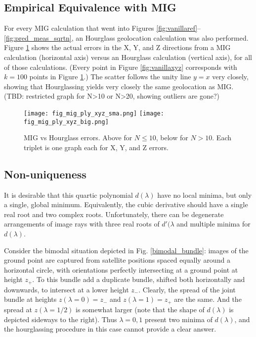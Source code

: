 \documentclass{amsart}
\begin{document}
\subsection{Empirical Equivalence with MIG}
For every MIG calculation that went into Figures
\ref{fig:vanillaref}--\ref{fig:pred_meas_sqrtn}, an Hourglass geolocation
calculation was also performed. Figure \ref{fig:mig_vs_hourglass} shows the
actual errors in the X, Y, and Z directions from a MIG calculation (horizontal
axis) versus an Hourglass calculation (vertical axis), for all of those
calculations. (Every point in Figure \ref{fig:vanillaxyz} corresponds with
$k=100$ points in Figure \ref{fig:mig_vs_hourglass}.) The scatter follows the
unity line $y=x$ very closely, showing that Hourglassing yields very closely the
same geolocation as MIG. (TBD: restricted graph for N>10 or N>20, showing
outliers are gone?)

\begin{figure}
\texttt{[image: fig\_mig\_ply\_xyz\_sma.png]}
\texttt{[image: fig\_mig\_ply\_xyz\_big.png]}
\caption{\label{fig:mig_vs_hourglass}MIG vs Hourglass errors.  Above for $N\le
  10$, below for $N>10$. Each triplet is one graph each for X, Y, and Z errors.}
\end{figure}


\subsection{Non-uniqueness}
It is desirable that this quartic polynomial $d(\lambda)$ have no
local minima, but only a single, global minimum. Equivalently, the
cubic derivative should have a single real root and two complex
roots. Unfortunately, there can be degenerate arrangements of image
rays with three real roots of $d'(\lambda$ and multiple minima for
$d(\lambda)$.

Consider the bimodal situation depicted in Fig. \ref{bimodal_bundle}:
images of the ground point are captured from satellite positions
spaced equally around a horizontal circle, with orientations perfectly
intersecting at a ground point at height $z_+$. To this bundle add a
duplicate bundle, shifted both horizontally and downwards, to
intersect at a lower height $z_-$. Clearly, the spread of the joint
bundle at heights $z(\lambda=0)=z_-$ and $z(\lambda=1)=z_+$ are the
same. And the spread at $z(\lambda=1/2)$ is somewhat larger (note that
the shape of $d(\lambda)$ is depicted sideways to the right). Thus
$\lambda={0,1}$ present two minima of $d(\lambda)$, and the
hourglassing procedure in this case cannot provide a clear answer.
\end{document}
